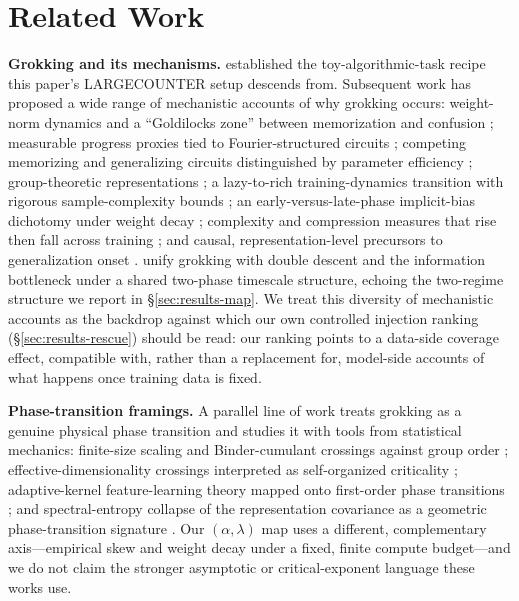 \documentclass[11pt]{article}
\begin{document}
\section{Related Work}

\textbf{Grokking and its mechanisms.} \citet{power2022grokking} established the toy-algorithmic-task recipe this paper's LARGECOUNTER setup descends from. Subsequent work has proposed a wide range of mechanistic accounts of why grokking occurs: weight-norm dynamics and a ``Goldilocks zone'' between memorization and confusion \citep{liu2022effectivetheory,liu2022omnigrok}; measurable progress proxies tied to Fourier-structured circuits \citep{nanda2023progress}; competing memorizing and generalizing circuits distinguished by parameter efficiency \citep{varma2023circuitefficiency}; group-theoretic representations \citep{chughtai2023toymodel}; a lazy-to-rich training-dynamics transition with rigorous sample-complexity bounds \citep{mohamadi2024whygrok}; an early-versus-late-phase implicit-bias dichotomy under weight decay \citep{lyu2024dichotomy}; complexity and compression measures that rise then fall across training \citep{liu2023grokkingcompression,demoss2024complexitydynamics}; and causal, representation-level precursors to generalization onset \citep{sivasankar2026circuitsync,howe2026representationalpriors}. \citet{demellokoch2025twophase} unify grokking with double descent and the information bottleneck under a shared two-phase timescale structure, echoing the two-regime structure we report in \S\ref{sec:results-map}. We treat this diversity of mechanistic accounts as the backdrop against which our own controlled injection ranking (\S\ref{sec:results-rescue}) should be read: our ranking points to a data-side coverage effect, compatible with, rather than a replacement for, model-side accounts of what happens once training data is fixed.

\textbf{Phase-transition framings.} A parallel line of work treats grokking as a genuine physical phase transition and studies it with tools from statistical mechanics: finite-size scaling and Binder-cumulant crossings against group order \citep{bi2026falsifiable}; effective-dimensionality crossings interpreted as self-organized criticality \citep{wang2026dimensional}; adaptive-kernel feature-learning theory mapped onto first-order phase transitions \citep{rubin2024firstorder}; and spectral-entropy collapse of the representation covariance as a geometric phase-transition signature \citep{truong2026spectralentropy}. Our $(\alpha,\lambda)$ map uses a different, complementary axis---empirical skew and weight decay under a fixed, finite compute budget---and we do not claim the stronger asymptotic or critical-exponent language these works use.
\end{document}
